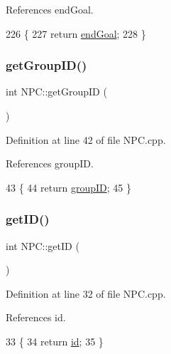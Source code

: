 References end\+Goal.


\begin{DoxyCode}
226 \{
227     \textcolor{keywordflow}{return} \hyperlink{class_n_p_c_ab2349a8d6757b61a73f87de9cba387d1}{endGoal};
228 \}
\end{DoxyCode}
\mbox{\label{class_n_p_c_a7ea10930901666fc087de1a74d339b84}} 
\subsubsection{\texorpdfstring{get\+Group\+I\+D()}{getGroupID()}}
{\footnotesize\ttfamily int N\+P\+C\+::get\+Group\+ID (\begin{DoxyParamCaption}{ }\end{DoxyParamCaption})}



Definition at line 42 of file N\+P\+C.\+cpp.



References group\+ID.


\begin{DoxyCode}
43 \{
44     \textcolor{keywordflow}{return} \hyperlink{class_n_p_c_ab370e8a4fbb5ccabdc06821f7dfda428}{groupID};
45 \}
\end{DoxyCode}
\mbox{\label{class_n_p_c_ac4588139be32c307a0d31e302f377dea}} 
\subsubsection{\texorpdfstring{get\+I\+D()}{getID()}}
{\footnotesize\ttfamily int N\+P\+C\+::get\+ID (\begin{DoxyParamCaption}{ }\end{DoxyParamCaption})}



Definition at line 32 of file N\+P\+C.\+cpp.



References id.


\begin{DoxyCode}
33 \{
34     \textcolor{keywordflow}{return} \hyperlink{class_n_p_c_a1b705223f885df652f2faffc4735d03c}{id};
35 \}
\end{DoxyCode}
\mbox{\label{class_n_p_c_a5f19b3b029fd8366921b5bb71335ee9a}} 
